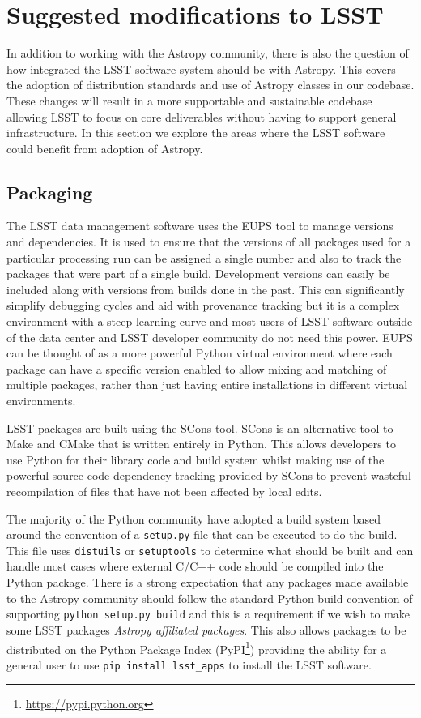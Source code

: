 \documentclass[]{spie}  %
\begin{document}
\section{Suggested modifications to LSST}
\label{sec:lsstmods}

In addition to working with the Astropy community, there is also the question of how integrated the LSST software system should be with Astropy.
This covers the adoption of distribution standards and use of Astropy classes in our codebase.
These changes will result in a more supportable and sustainable codebase allowing LSST to focus on core deliverables without having to support general infrastructure.
In this section we explore the areas where the LSST software could benefit from adoption of Astropy.

\subsection{Packaging}

\label{sec:packaging}

The LSST data management software uses the EUPS tool\cite{EUPS} to manage versions and dependencies.
It is used to ensure that the versions of all packages used for a particular processing run can be assigned a single number and also to track the packages that were part of a single build.
Development versions can easily be included along with versions from builds done in the past.
This can significantly simplify debugging cycles and aid with provenance tracking but it is a complex environment with a steep learning curve and most users of LSST software outside of the data center and LSST developer community do not need this power.
EUPS can be thought of as a more powerful Python virtual environment where each package can have a specific version enabled to allow mixing and matching of multiple packages, rather than just having entire installations in different virtual environments.

LSST packages are built using the SCons tool\cite{2005Scons1377085}.
SCons is an alternative tool to Make and CMake that is written entirely in Python.
This allows developers to use Python for their library code and build system whilst making use of the powerful source code dependency tracking provided by SCons to prevent wasteful recompilation of files that have not been affected by local edits.

The majority of the Python community have adopted a build system based around the convention of a \texttt{setup.py} file that can be executed to do the build.
This file uses \texttt{distuils} or \texttt{setuptools} to determine what should be built and can handle most cases where external C/C++ code should be compiled into the Python package.
There is a strong expectation that any packages made available to the Astropy community should follow the standard Python build convention of supporting \texttt{python setup.py build} and this is a requirement if we wish to make some LSST packages \emph{Astropy affiliated packages}.
This also allows packages to be distributed on the Python Package Index (PyPI\footnote{\url{https://pypi.python.org}}) providing the ability for a general user to use \texttt{pip install lsst\_apps} to install the LSST software.
\end{document}
